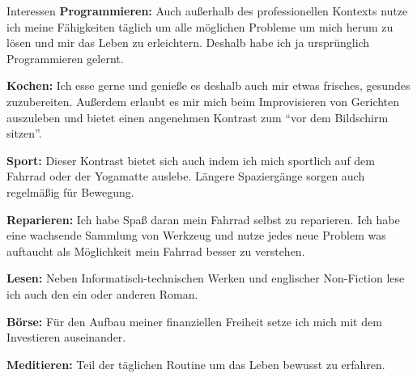 \documentclass{cv}
\begin{document}
\begin{rSection}{Interessen}
  {\bf Programmieren:} Auch außerhalb des professionellen Kontexts nutze ich meine
Fähigkeiten täglich um alle möglichen Probleme um mich herum zu lösen und mir
das Leben zu erleichtern.
Deshalb habe ich ja ursprünglich Programmieren gelernt.

  {\bf Kochen:} Ich esse gerne und genieße es deshalb auch mir etwas frisches,
gesundes zuzubereiten. Außerdem erlaubt es mir mich beim Improvisieren von
Gerichten auszuleben und bietet einen angenehmen Kontrast zum ``vor dem
Bildschirm sitzen''.

  {\bf Sport:} Dieser Kontrast bietet sich auch indem ich mich sportlich auf dem
Fahrrad oder der Yogamatte auslebe. Längere Spaziergänge sorgen auch regelmäßig
für Bewegung.

  {\bf Reparieren:} Ich habe Spaß daran mein Fahrrad selbst zu reparieren. Ich habe eine wachsende Sammlung von Werkzeug und nutze jedes neue Problem was auftaucht als Möglichkeit mein Fahrrad besser zu verstehen.

  {\bf Lesen:} Neben Informatisch-technischen Werken und englischer
Non-Fiction lese ich auch den ein oder anderen Roman.

  {\bf Börse:} Für den Aufbau meiner finanziellen Freiheit setze ich mich mit dem
Investieren auseinander.

  {\bf Meditieren:} Teil der täglichen Routine um das Leben bewusst zu erfahren.

\end{rSection}
\end{document}
